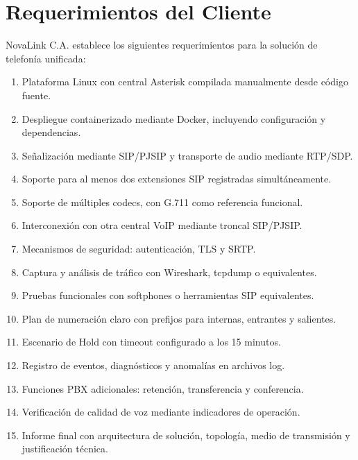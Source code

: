 \documentclass[12pt,a4paper]{article}
\begin{document}
\section{Requerimientos del Cliente}

NovaLink C.A. establece los siguientes requerimientos para la solución de telefonía unificada:

\begin{enumerate}
    \item Plataforma Linux con central Asterisk compilada manualmente desde código fuente.
    \item Despliegue containerizado mediante Docker, incluyendo configuración y dependencias.
    \item Señalización mediante SIP/PJSIP y transporte de audio mediante RTP/SDP.
    \item Soporte para al menos dos extensiones SIP registradas simultáneamente.
    \item Soporte de múltiples codecs, con G.711 como referencia funcional.
    \item Interconexión con otra central VoIP mediante troncal SIP/PJSIP.
    \item Mecanismos de seguridad: autenticación, TLS y SRTP.
    \item Captura y análisis de tráfico con Wireshark, tcpdump o equivalentes.
    \item Pruebas funcionales con softphones o herramientas SIP equivalentes.
    \item Plan de numeración claro con prefijos para internas, entrantes y salientes.
    \item Escenario de Hold con timeout configurado a los 15 minutos.
    \item Registro de eventos, diagnósticos y anomalías en archivos log.
    \item Funciones PBX adicionales: retención, transferencia y conferencia.
    \item Verificación de calidad de voz mediante indicadores de operación.
    \item Informe final con arquitectura de solución, topología, medio de transmisión y justificación técnica.
\end{enumerate}

\end{document}
